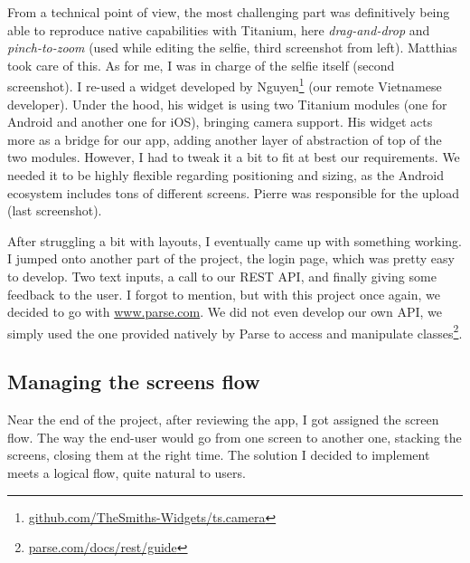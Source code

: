 From a technical point of view, the most challenging part was definitively being able to reproduce native capabilities with Titanium, here \textit{drag-and-drop} and \textit{pinch-to-zoom} (used while editing the selfie, third screenshot from left). Matthias took care of this. As for me, I was in charge of the selfie itself (second screenshot). I re-used a widget developed by Nguyen\footnote{\href{https://github.com/TheSmiths-Widgets/ts.camera}{github.com/TheSmiths-Widgets/ts.camera}} (our remote Vietnamese developer). Under the hood, his widget is using two Titanium modules (one for Android and another one for iOS), bringing camera support. His widget acts more as a bridge for our app, adding another layer of abstraction of top of the two modules. However, I had to tweak it a bit to fit at best our requirements. We needed it to be highly flexible regarding positioning and sizing, as the Android ecosystem includes tons of different screens. Pierre was responsible for the upload (last screenshot).

\medskip

After struggling a bit with layouts, I eventually came up with something working. I jumped onto another part of the project, the login page, which was pretty easy to develop. Two text inputs, a call to our REST API, and finally giving some feedback to the user. I forgot to mention, but with this project once again, we decided to go with \href{http://www.parse.com/}{www.parse.com}. We did not even develop our own API, we simply used the one provided natively by Parse to access and manipulate classes\footnote{\href{https://parse.com/docs/rest/guide}{parse.com/docs/rest/guide}}.

\subsection{Managing the screens flow}

Near the end of the project, after reviewing the app, I got assigned the screen flow. The way the end-user would go from one screen to another one, stacking the screens, closing them at the right time. The solution I decided to implement meets a logical flow, quite natural to users.

